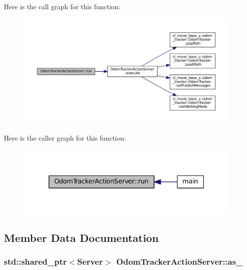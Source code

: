 Here is the call graph for this function\+:
\nopagebreak
\begin{figure}[H]
\begin{center}
\leavevmode
\includegraphics[width=350pt]{classOdomTrackerActionServer_a8ab6984c7383949a048d72437e9f79d3_cgraph}
\end{center}
\end{figure}




Here is the caller graph for this function\+:
\nopagebreak
\begin{figure}[H]
\begin{center}
\leavevmode
\includegraphics[width=320pt]{classOdomTrackerActionServer_a8ab6984c7383949a048d72437e9f79d3_icgraph}
\end{center}
\end{figure}




\subsection{Member Data Documentation}
\subsubsection[{\texorpdfstring{as\+\_\+}{as_}}]{\setlength{\rightskip}{0pt plus 5cm}std\+::shared\+\_\+ptr$<${\bf Server}$>$ Odom\+Tracker\+Action\+Server\+::as\+\_\+}\hypertarget{classOdomTrackerActionServer_a28bed1d95003d837b2b47053dbc66878}{}\label{classOdomTrackerActionServer_a28bed1d95003d837b2b47053dbc66878}


